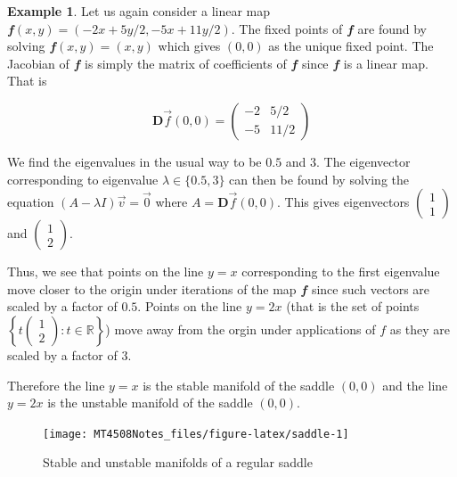 \documentclass[
  a4paper,
  oneside,
  final]{krantz}
\newcommand{\R}{\mathbb{R}}
\renewcommand{\v}[1]{{\mathbfit{#1}}}
\newcommand{\jacob}{{\mathbf{D}}\vec{f}}
\theoremstyle{definition}
\theoremstyle{definition}
\newtheorem{example}{Example}[chapter]
\theoremstyle{definition}
\theoremstyle{definition}
\theoremstyle{remark}
\begin{document}
\begin{example}

Let us again consider a linear map \(\v{f}(x,y) = (-2x + 5y/2, -5x + 11y/2)\). The fixed points of \(\v{f}\) are found by solving \(\v{f}(x,y) = (x,y)\) which gives \((0,0)\) as the unique fixed point. The Jacobian of \(\v{f}\) is simply the matrix of coefficients of \(\v{f}\) since \(\v{f}\) is a linear map. That is

\[ 
\jacob{(0,0)} = \begin{pmatrix}
                  -2 & 5/2 \\
                  -5 &  11/2
                \end{pmatrix}
\]

We find the eigenvalues in the usual way to be \(0.5\) and \(3\). The eigenvector corresponding to eigenvalue \(\lambda \in \{0.5, 3\}\) can then be found by solving the equation \((A- \lambda I) \vec{v} = \vec{0}\) where \(A = \jacob{(0,0)}\). This gives eigenvectors \(\begin{pmatrix}1 \\ 1 \end{pmatrix}\) and \(\begin{pmatrix} 1 \\ 2 \end{pmatrix}\).

Thus, we see that points on the line \(y = x\) corresponding to the first eigenvalue move closer to the origin under iterations of the map \(\v{f}\) since such vectors are scaled by a factor of \(0.5\). Points on the line \(y = 2x\) (that is the set of points \(\left\{t \begin{pmatrix} 1 \\ 2 \end{pmatrix} : t \in \R \right\}\)) move away from the orgin under applications of \(f\) as they are scaled by a factor of \(3\).

Therefore the line \(y=x\) is the stable manifold of the saddle \((0,0)\) and the line \(y=2x\) is the unstable manifold of the saddle \((0,0)\).

\begin{figure}

{\centering \texttt{[image: MT4508Notes\_files/figure-latex/saddle-1]} 

}

\caption{Stable and unstable manifolds of a regular saddle}\label{fig:saddle}
\end{figure}

\end{example}
\end{document}
